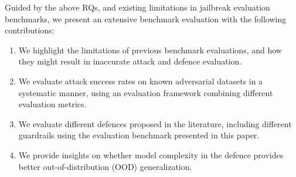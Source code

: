 Guided by the above RQs, and existing limitations in jailbreak evaluation benchmarks, we present an extensive benchmark evaluation with the following contributions:

\begin{enumerate}[leftmargin=*,label=\Roman*,noitemsep]
    \item We highlight the limitations of previous benchmark evaluations, and how they might result in inaccurate attack and defence evaluation. 
    \item We evaluate attack success rates on known adversarial datasets in a systematic manner, using an evaluation framework combining different evaluation metrics.  
    \item We evaluate different defences proposed in the literature, including different guardrails using the evaluation benchmark presented in this paper.
    \item We provide insights on whether model complexity in the defence provides better out-of-distribution (OOD) generalization.   
\end{enumerate}